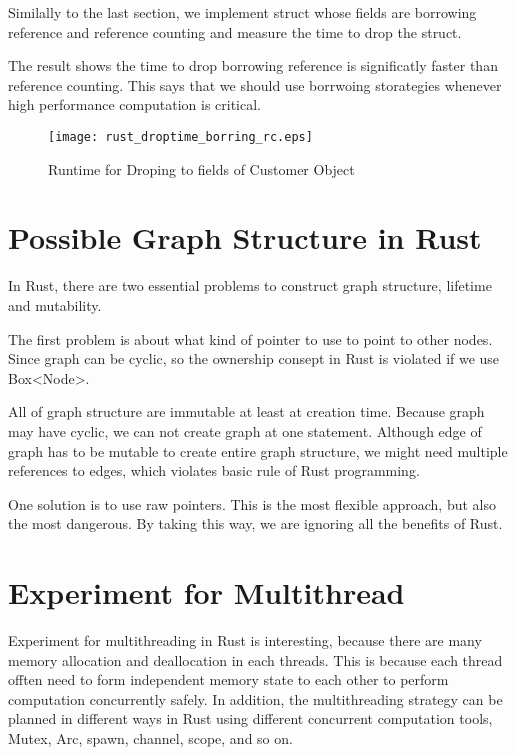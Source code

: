 Similally to the last section, we implement struct whose fields are borrowing reference and reference counting and measure the time to drop the struct. 

The result shows the time to drop borrowing reference is significatly faster than reference counting. This says that we should use borrwoing storategies whenever high performance computation is critical.


\begin{figure}[htb]
    \texttt{[image: rust\_droptime\_borring\_rc.eps]}
    \caption{Runtime for Droping to fields of Customer Object}
    \label{fig:Sampling}
\end{figure}

\section{Possible Graph Structure in Rust}
\label{sec:history}
In Rust, there are two essential problems to construct graph structure, lifetime and mutability. 

The first problem is about what kind of pointer to use to point to other nodes. 
Since graph can be cyclic, so the ownership consept in Rust is violated if we use Box<Node>.

All of graph structure are immutable at least at creation time. Because graph may have cyclic, 
we can not create graph at one statement. Although edge of graph has to be mutable to create entire graph structure, 
we might need multiple references to edges, which violates basic rule of Rust programming.

One solution is to use raw pointers. This is the most flexible approach, but also the most dangerous. 
By taking this way, we are ignoring all the benefits of Rust.

\section{Experiment for Multithread}
\label{sec:history}
Experiment for multithreading in Rust is interesting, because there are many memory allocation and deallocation in each threads.
This is because each thread offten need to form independent memory state to each other to perform computation concurrently safely.
In addition, the multithreading strategy can be planned in different ways in Rust using different concurrent computation tools, 
Mutex, Arc, spawn, channel, scope, and so on.

